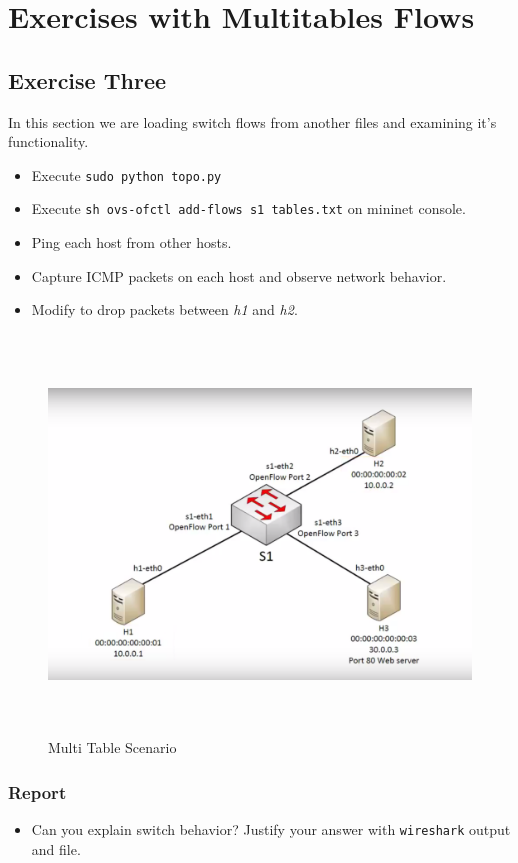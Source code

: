 \documentclass{../UTNetLab}
\begin{document}
\section{Exercises with Multitables Flows}
    \subsection*{Exercise Three}
    In this section we are loading switch flows from another files and examining it's functionality.

    \begin{itemize}
        \item Execute \lstinline{sudo python topo.py} 
        \item Execute \lstinline{sh ovs-ofctl add-flows s1 tables.txt} on mininet console.
        \item Ping each host from other hosts.
        \item Capture ICMP packets on each host and observe network behavior.
        \item Modify  to drop packets between \textit{h1} and \textit{h2}.
    \end{itemize}

    \begin{figure}[H]
        \centering
        \includegraphics[height=300pt]{img/fig2.png}
        \caption{Multi Table Scenario}
        \label{fig:MultiTableScenario}
    \end{figure}


    \subsubsection*{Report}
    \begin{itemize}
        \item Can you explain switch behavior? Justify your answer with \lstinline{wireshark} output and  file.
    \end{itemize}
\end{document}
